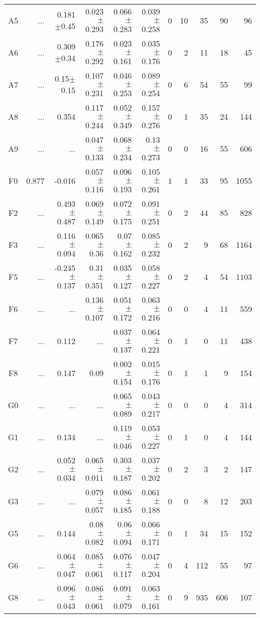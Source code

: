 \begin{table}[t]
\begin{center}
\begin{tabular}{c|rrrrr|rrrrr}
A5	&	 ...	&	0.181$\pm$0.45	&	0.023$\pm$0.293	&	0.066$\pm$0.283	&	0.039$\pm$0.258	&	0	&	10	&	35	&	90	&	96	\\
A6	&	 ...	&	0.309$\pm$0.34	&	0.176$\pm$0.292	&	0.023$\pm$0.161	&	0.035$\pm$0.176	&	0	&	2	&	11	&	18	&	45	\\
A7	&	 ...	&	0.15$\pm$0.15	&	0.107$\pm$0.231	&	0.046$\pm$0.253	&	0.089$\pm$0.254	&	0	&	6	&	54	&	55	&	99	\\
A8	&	 ...	&	0.354	&	0.117$\pm$0.244	&	0.052$\pm$0.349	&	0.157$\pm$0.276	&	0	&	1	&	35	&	24	&	144	\\
A9	&	 ...	&	 ...	&	0.047$\pm$0.133	&	0.068$\pm$0.234	&	0.13$\pm$0.273	&	0	&	0	&	16	&	55	&	606	\\
F0	&	0.877	&	-0.016	&	0.057$\pm$0.116	&	0.096$\pm$0.193	&	0.105$\pm$0.261	&	1	&	1	&	33	&	95	&	1055	\\
F2	&	 ...	&	0.493$\pm$0.487	&	0.069$\pm$0.149	&	0.072$\pm$0.175	&	0.091$\pm$0.251	&	0	&	2	&	44	&	85	&	828	\\
F3	&	 ...	&	0.116$\pm$0.094	&	0.065$\pm$0.36	&	0.07$\pm$0.162	&	0.085$\pm$0.232	&	0	&	2	&	9	&	68	&	1164	\\
F5	&	 ...	&	-0.245$\pm$0.137	&	0.31$\pm$0.351	&	0.035$\pm$0.127	&	0.058$\pm$0.227	&	0	&	2	&	4	&	54	&	1103	\\
F6	&	 ...	&	 ...	&	0.136$\pm$0.107	&	0.051$\pm$0.172	&	0.063$\pm$0.216	&	0	&	0	&	4	&	11	&	559	\\
F7	&	 ...	&	0.112	&	 ...	&	0.037$\pm$0.137	&	0.064$\pm$0.221	&	0	&	1	&	0	&	11	&	438	\\
F8	&	 ...	&	0.147	&	0.09	&	0.002$\pm$0.154	&	0.015$\pm$0.176	&	0	&	1	&	1	&	9	&	154	\\
G0	&	 ...	&	 ...	&	 ...	&	0.065$\pm$0.089	&	0.043$\pm$0.217	&	0	&	0	&	0	&	4	&	314	\\
G1	&	 ...	&	0.134	&	 ...	&	0.119$\pm$0.046	&	0.053$\pm$0.227	&	0	&	1	&	0	&	4	&	144	\\
G2	&	 ...	&	0.052$\pm$0.034	&	0.065$\pm$0.011	&	0.303$\pm$0.187	&	0.037$\pm$0.202	&	0	&	2	&	3	&	2	&	147	\\
G3	&	 ...	&	 ...	&	0.079$\pm$0.057	&	0.086$\pm$0.185	&	0.061$\pm$0.188	&	0	&	0	&	8	&	12	&	203	\\
G5	&	 ...	&	0.144	&	0.08$\pm$0.082	&	0.06$\pm$0.094	&	0.066$\pm$0.171	&	0	&	1	&	34	&	15	&	152	\\
G6	&	 ...	&	0.064$\pm$0.047	&	0.085$\pm$0.061	&	0.076$\pm$0.117	&	0.047$\pm$0.204	&	0	&	4	&	112	&	55	&	97	\\
G8	&	 ...	&	0.096$\pm$0.043	&	0.086$\pm$0.061	&	0.091$\pm$0.079	&	0.063$\pm$0.161	&	0	&	9	&	935	&	606	&	107	\\

\end{tabular}
\end{center}
\end{table}
